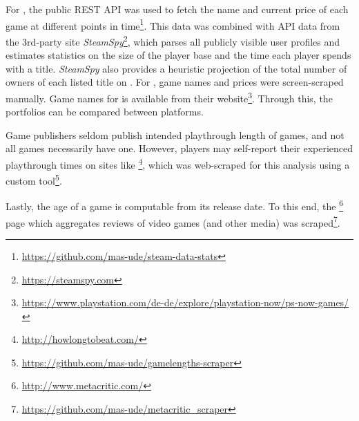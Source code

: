 For \steam, the public \acrshort{REST} \acrshort{API} was used to
fetch the name and current price of each game at different points in
time\footnote{\url{https://github.com/mas-ude/steam-data-stats}}. This
data was combined with \acrshort{API} data from the 3rd-party site
\textit{SteamSpy}\footnote{\url{https://steamspy.com}}, which parses all
publicly visible \steam user profiles and
estimates statistics on the size of the player base and the time each
player spends with a title. \textit{SteamSpy} also provides a heuristic
projection of the total number of owners of each listed title on \steam.
For \gfnow, game names and prices were screen-scraped manually.
Game names for \psnow is available from their website\footnote{\url{https://www.playstation.com/de-de/explore/playstation-now/ps-now-games/}}.
Through this, the portfolios can be compared between platforms.

Game publishers seldom publish intended playthrough
length of games, and not all games necessarily have one. However, players
may self-report their experienced playthrough times on sites like
\hltb\footnote{\url{http://howlongtobeat.com/}}, which was web-scraped
for this analysis using a custom tool\footnote{\url{https://github.com/mas-ude/gamelengths-scraper}}.


Lastly, the age of a game is computable from its release date. To this end, the
\metacritic\footnote{\url{http://www.metacritic.com/}} page which
aggregates reviews of video games (and other media) was
scraped\footnote{\url{https://github.com/mas-ude/metacritic_scraper}}.

